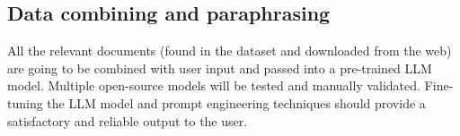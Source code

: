 \documentclass[fleqn,moreauthors,10pt]{ds_report}
\begin{document}
\subsection*{Data combining and paraphrasing}

All the relevant documents (found in the dataset and downloaded from the web) are going to be combined with user input and passed into a pre-trained LLM model. Multiple open-source models will be tested and manually validated. Fine-tuning the LLM model and prompt engineering techniques should provide a satisfactory and reliable output to the user.




\



\end{document}
